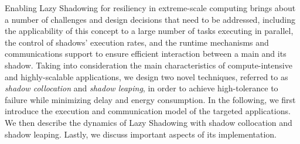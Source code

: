 Enabling Lazy Shadowing for resiliency in extreme-scale computing 
brings about a number of challenges and design decisions that need to be addressed, including the applicability of this concept to a large number of 
tasks executing in parallel, the control of shadows' execution rates, and the runtime mechanisms and 
communications support to ensure efficient interaction between a 
main and its shadow.
Taking into consideration the main characteristics of compute-intensive and highly-scalable applications, we design two novel techniques, referred to as {\it shadow collocation} and {\it shadow leaping}, in order to achieve high-tolerance to failure while minimizing delay and energy consumption. In the following, we first introduce the execution and communication model of the targeted applications. We then describe the dynamics of Lazy Shadowing with shadow collocation and shadow leaping. Lastly, we discuss important aspects of its implementation. 





%



